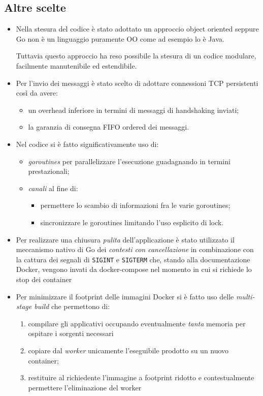 \documentclass[conference]{IEEEtran}
\begin{document}
\subsection{Altre scelte}
\begin{itemize}
\item Nella stesura del codice è stato adottato un approccio object oriented seppure Go non è un linguaggio puramente OO come ad esempio lo è Java.

Tuttavia questo approccio ha reso possibile la stesura di un codice modulare, facilmente manutenibile ed estendibile.

\item Per l'invio dei messaggi è stato scelto di adottare connessioni TCP persistenti così da avere:
\begin{itemize}
\item un overhead inferiore in termini di messaggi di handshaking inviati;
\item la garanzia di consegna FIFO ordered dei messaggi.
\end{itemize}

\item Nel codice si è fatto significativamente uso di:
\begin{itemize}
\item \textsl{goroutines} per parallelizzare l'esecuzione guadagnando in termini prestazionali;
\item \textsl{canali} al fine di:
\begin{itemize}
\item permettere lo scambio di informazioni fra le varie goroutines;
\item sincronizzare le goroutines limitando l'uso esplicito di lock.
\end{itemize}
\end{itemize}

\item Per realizzare una chiusura \textit{pulita} dell'applicazione è stato utilizzato il meccanismo nativo di Go dei \textit{contesti con cancellazione} in combinazione con la cattura dei segnali di \texttt{SIGINT} e \texttt{SIGTERM} che, stando alla documentazione Docker, vengono invati da docker-compose nel momento in cui si richiede lo stop dei container

\item Per minimizzare il footprint delle immagini Docker si è fatto uso delle \textsl{multi-stage build} che permettono di:
\begin{enumerate}
\item compilare gli applicativi occupando eventualmente \textit{tanta} memoria per ospitare i sorgenti necessari
\item copiare dal \textit{worker} unicamente l'eseguibile prodotto su un nuovo container;
\item restituire al richiedente l'immagine a footprint ridotto e contestualmente permettere l'eliminazione del worker
\end{enumerate}
\end{itemize}
\end{document}
